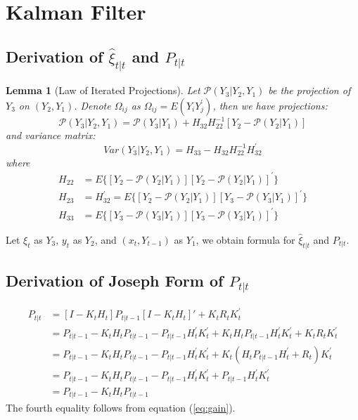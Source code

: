\documentclass[12pt]{article}
\newtheorem{lemma}{Lemma}
\numberwithin{equation}{section}
\begin{document}
\section{Kalman Filter}
\subsection{Derivation of $\hat{\xi}_{t|t}$ and $P_{t|t}$} \label{ap:iter_proj}
\begin{lemma}[Law of Iterated Projections] \label{lem:1}
    Let $\mathcal{P}(Y_3|Y_2,Y_1)$ be the projection of $Y_3$ on $(Y_2, Y_1)$. Denote $\Omega_{ij}$ as $\Omega_{ij} = E(Y_iY_j^{'})$, then we have projections:
    \[
        \mathcal{P}(Y_3|Y_2,Y_1) = \mathcal{P}(Y_3|Y_1)+H_{32}H_{22}^{-1}[Y_2 - \mathcal{P}(Y_2|Y_1)]
    \]
    and variance matrix:
    \[
        Var(Y_3|Y_2,Y_1) = H_{33} - H_{32}H_{22}^{-1}H_{32}^{'}
    \]
    where 
    \begin{align*}
        H_{22} &= E\{[Y_2-\mathcal{P}(Y_2|Y_1)][Y_2-\mathcal{P}(Y_2|Y_1)]^{'}\} \\
        H_{23} &= H_{32}^{'} = E\{[Y_2-\mathcal{P}(Y_2|Y_1)][Y_3-\mathcal{P}(Y_3|Y_1)]^{'}\} \\
        H_{33} &= E\{[Y_3-\mathcal{P}(Y_3|Y_1)][Y_3-\mathcal{P}(Y_3|Y_1)]^{'}\}
    \end{align*}
\end{lemma}

Let $\xi_t$ as $Y_3$, $y_t$ as $Y_2$, and $(x_t,Y_{t-1})$ as $Y_1$, we obtain formula for $\hat{\xi}_{t|t}$ and $P_{t|t}$.

\subsection{Derivation of Joseph Form of $P_{t|t}$} \label{ap:joseph}
\begin{align*}
    P_{t|t} &= [I - K_tH_t]P_{t|t-1}[I - K_tH_t]' + K_tR_tK_t^{'} \\
    &= P_{t|t-1} - K_tH_tP_{t|t-1} - P_{t|t-1}H_t^{'}K_t^{'} + K_tH_tP_{t|t-1}H_t^{'}K_t^{'} + K_tR_tK_t^{'} \\
    &= P_{t|t-1} - K_tH_tP_{t|t-1} - P_{t|t-1}H_t^{'}K_t^{'} + K_t(H_tP_{t|t-1}H_t^{'} + R_t)K_t^{'} \\
    &= P_{t|t-1} - K_tH_tP_{t|t-1} - P_{t|t-1}H_t^{'}K_t^{'} + P_{t|t-1}H_t^{'}K_t^{'} \\
    &= P_{t|t-1} - K_tH_tP_{t|t-1}
\end{align*}
The fourth equality follows from equation (\ref{eq:gain}).
\end{document}
